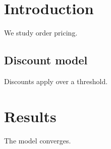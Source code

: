 \documentclass{article}
\begin{document}
\section{Introduction}
We study order pricing.

\subsection{Discount model}
Discounts apply over a threshold.

\section{Results}
The model converges.
\end{document}
